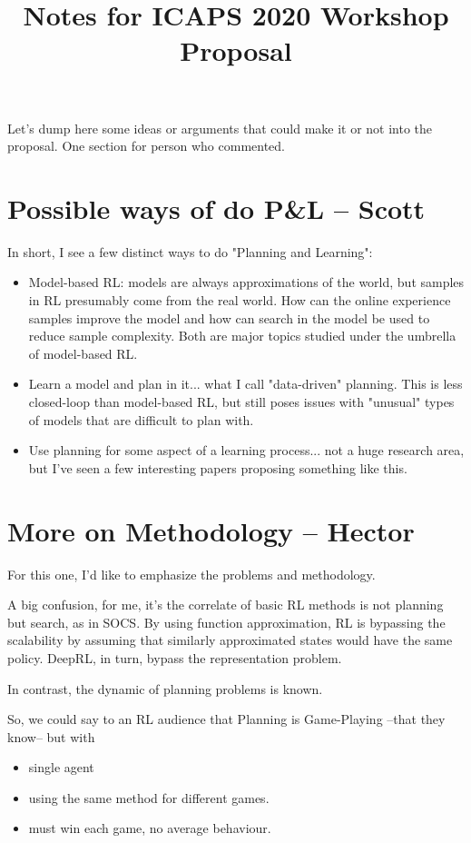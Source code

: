 \documentclass[10pt]{article}
\begin{document}
\title{Notes for ICAPS 2020 Workshop Proposal}
\date{}

\author{}

\maketitle

Let's dump here some ideas or arguments that could make it or not into the proposal.
One section for person who commented.

\section*{Possible ways of do P\&L -- Scott}
In short, I see a few distinct ways to do "Planning and Learning":

\begin{itemize}
\item Model-based RL: models are always approximations of the world, but samples in RL presumably come from the real world.  How can the online experience samples improve the model and how can search in the model be used to reduce sample complexity.  Both are major topics studied under the umbrella of model-based RL.
\item Learn a model and plan in it... what I call "data-driven" planning.  This is less closed-loop than model-based RL, but still poses issues with "unusual" types of models that are difficult to plan with.
\item Use planning for some aspect of a learning process... not a huge research area, but I've seen a few interesting papers proposing something like this.
\end{itemize}

\section*{More on Methodology – Hector}

For this one, I'd like to emphasize the problems and methodology.

A big confusion, for me, it's the correlate of basic RL methods is not planning but search, as in SOCS.
By using function approximation, RL is bypassing the scalability
by assuming that similarly approximated states would have the same policy.
DeepRL, in turn, bypass the representation problem.

In contrast, the dynamic of planning problems is known.

So, we could say to an RL audience that Planning is Game-Playing –that they know– but with
\begin{itemize}
\item single agent
\item using the same method for different games.
\item must win each game, no average behaviour. 
\end{itemize}
\end{document}
